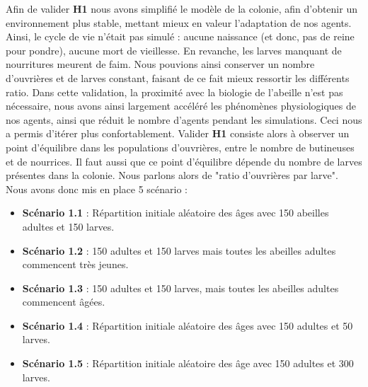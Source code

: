 			Afin de valider \textbf{H1} nous avons simplifié le modèle de la colonie, afin d'obtenir un environnement plus stable, mettant mieux en valeur l'adaptation de nos agents. Ainsi, le cycle de vie n'était pas simulé : aucune naissance (et donc, pas de reine pour pondre), aucune mort de vieillesse. En revanche, les larves manquant de nourritures meurent de faim. Nous pouvions ainsi conserver un nombre d'ouvrières et de larves constant, faisant de ce fait mieux ressortir les différents ratio. Dans cette validation, la proximité avec la biologie de l'abeille n'est pas nécessaire, nous avons ainsi largement accéléré les phénomènes physiologiques de nos agents, ainsi que réduit le nombre d'agents pendant les simulations. Ceci nous a permis d'itérer plus confortablement. Valider \textbf{H1} consiste alors à observer un point d'équilibre dans les populations d'ouvrières, entre le nombre de butineuses et de nourrices. Il faut aussi que ce point d'équilibre dépende du nombre de larves présentes dans la colonie. Nous parlons alors de "ratio d'ouvrières par larve". Nous avons donc mis en place 5 scénario :
			\begin{itemize}
				\item \textbf{Scénario 1.1} : Répartition initiale aléatoire des âges avec 150 abeilles adultes et 150 larves.
				\item \textbf{Scénario 1.2} : 150 adultes et 150 larves mais toutes les abeilles adultes commencent très jeunes.
				\item \textbf{Scénario 1.3} : 150 adultes et 150 larves, mais toutes les abeilles adultes commencent âgées.
				\item \textbf{Scénario 1.4} : Répartition initiale aléatoire des âges avec 150 adultes et 50 larves.
				\item \textbf{Scénario 1.5} : Répartition initiale aléatoire des âge avec 150 adultes et 300 larves.
			\end{itemize}
			
